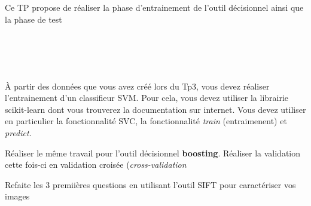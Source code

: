 \documentclass[12pt]{tdtp}
\begin{document}
\titre
Ce TP propose de réaliser la phase d'entrainement de l'outil décisionnel ainsi que la phase de test\\
\\
\\
\\\

\Exo

À partir des données que vous avez créé lors du Tp3, vous devez réaliser l'entrainement d'un classifieur SVM.
Pour cela, vous devez utiliser la librairie scikit-learn dont vous trouverez la documentation sur internet.
Vous devez utiliser en particulier la fonctionnalité SVC, la fonctionnalité \textit{train} (entraimenent) et \textit{predict}.

\Exo

Réaliser le même travail pour l'outil décisionnel \textbf{boosting}.
Réaliser la validation cette fois-ci en validation croisée (\textit{cross-validation}

\Exo 

Refaite les 3 premiières questions en utilisant l'outil SIFT pour caractériser vos images
\end{document}
